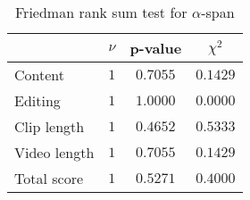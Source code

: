 \begin{table}[ht]
	\begin{center}
	\caption{Friedman rank sum test for $\alpha$-span}
	\label{tab:fried_alpha}
		\begin{tabular}{lccc}
		\toprule
			 & $\nu$ & p-value & $\chi^2$\\
			\midrule
			Content & $1$ & $0.7055$ & $0.1429$\\
			Editing & $1$ & $1.0000$ & $0.0000$\\
			Clip length & $1$ & $0.4652$ & $0.5333$\\
			Video length & $1$ & $0.7055$ & $0.1429$\\
			Total score & $1$ & $0.5271$ & $0.4000$\\
		\bottomrule
		\end{tabular}
	\end{center}
\end{table}